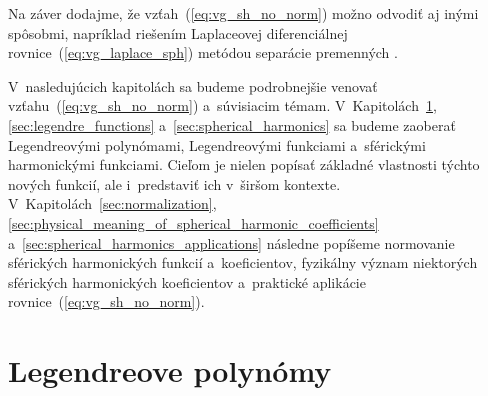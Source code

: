 \documentclass[a4paper,12pt]{book}
\begin{document}
Na záver dodajme, že vzťah~(\ref{eq:vg_sh_no_norm}) možno odvodiť aj inými 
spôsobmi, napríklad riešením Laplaceovej diferenciálnej 
rovnice~(\ref{eq:vg_laplace_sph}) metódou separácie premenných 
\parencite{MoritzPhysicalGeodesy,Janak2006}.

V~nasledujúcich kapitolách sa budeme podrobnejšie venovať
vzťahu~(\ref{eq:vg_sh_no_norm}) a~súvisiacim témam.
V~Kapitolách~\ref{sec:legendre_polynomials}, \ref{sec:legendre_functions}
a~\ref{sec:spherical_harmonics} sa budeme zaoberať Legendreovými polynómami,
Legendreovými funkciami a~sférickými harmonickými funkciami.  Cieľom je nielen
popísať základné vlastnosti týchto nových funkcií, ale i~predstaviť ich
v~širšom kontexte.  V~Kapitolách~\ref{sec:normalization},
\ref{sec:physical_meaning_of_spherical_harmonic_coefficients}
a~\ref{sec:spherical_harmonics_applications} následne popíšeme normovanie
sférických harmonických funkcií a~koeficientov, fyzikálny význam niektorých
sférických harmonických koeficientov a~praktické aplikácie
rovnice~(\ref{eq:vg_sh_no_norm}).






\section{Legendreove polynómy}
\label{sec:legendre_polynomials}
\end{document}
